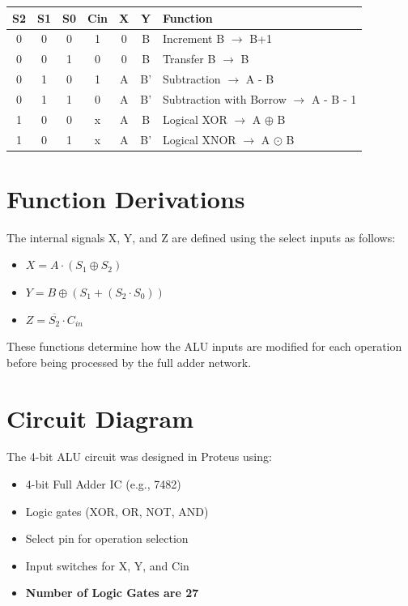 \documentclass[12pt]{article}
\begin{document}
\begin{center}
\renewcommand{\arraystretch}{1.4}
\begin{tabular}{|c|c|c|c|c|c|l|}
\hline
\textbf{S2} & \textbf{S1} & \textbf{S0} & \textbf{Cin} & \textbf{X} & \textbf{Y} & \textbf{Function} \\ \hline
0 & 0 & 0 & 1 & 0 & B & Increment B $\rightarrow$ B+1 \\ \hline
0 & 0 & 1 & 0 & 0 & B & Transfer B $\rightarrow$ B \\ \hline
0 & 1 & 0 & 1 & A & B' & Subtraction $\rightarrow$ A - B \\ \hline
0 & 1 & 1 & 0 & A & B' & Subtraction with Borrow $\rightarrow$ A - B - 1 \\ \hline
1 & 0 & 0 & x & A & B & Logical XOR $\rightarrow$ A $\oplus$ B \\ \hline
1 & 0 & 1 & x & A & B' & Logical XNOR $\rightarrow$ A $\odot$ B \\ \hline
\end{tabular}
\end{center}

\section{Function Derivations}
The internal signals X, Y, and Z are defined using the select inputs as follows: \\

\begin{itemize}
    \item $X = A \cdot (S_1 \oplus S_2)$
    \item $Y = B \oplus (S_1 + (S_2 \cdot S_0))$
    \item $Z = \overline{S_2} \cdot C_{in}$
\end{itemize}


These functions determine how the ALU inputs are modified for each operation before being processed by the full adder network.

\section{Circuit Diagram}
The 4-bit ALU circuit was designed in Proteus using:
\begin{itemize}
    \item 4-bit Full Adder IC (e.g., 7482)
    \item Logic gates (XOR, OR, NOT, AND)
    \item Select pin for operation selection
    \item Input switches for X, Y, and Cin
    \item \textbf{Number of Logic Gates are 27}
\end{itemize}
\end{document}
